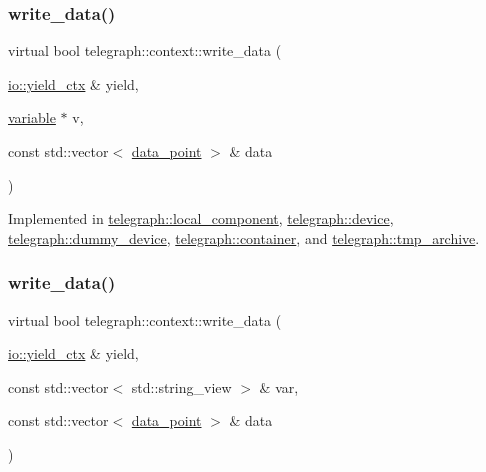 \mbox{\label{classtelegraph_1_1context_a6067b9a6f2590733c81f6a3b2ed9cba7}} 
\subsubsection{\texorpdfstring{write\+\_\+data()}{write\_data()}\hspace{0.1cm}{\footnotesize\ttfamily [1/2]}}
{\footnotesize\ttfamily virtual bool telegraph\+::context\+::write\+\_\+data (\begin{DoxyParamCaption}\item[{\hyperlink{structboost_1_1asio_1_1yield__ctx}{io\+::yield\+\_\+ctx} \&}]{yield,  }\item[{\hyperlink{classtelegraph_1_1variable}{variable} $\ast$}]{v,  }\item[{const std\+::vector$<$ \hyperlink{classtelegraph_1_1data__point}{data\+\_\+point} $>$ \&}]{data }\end{DoxyParamCaption})\hspace{0.3cm}{\ttfamily [pure virtual]}}



Implemented in \hyperlink{classtelegraph_1_1local__component_ac546cfea4802ef3ca125c5dc183adf6c}{telegraph\+::local\+\_\+component}, \hyperlink{classtelegraph_1_1device_a60150e55bc6fb63d27252051caf462db}{telegraph\+::device}, \hyperlink{classtelegraph_1_1dummy__device_a162f8f7a02c2907693ecf86662f6ffe1}{telegraph\+::dummy\+\_\+device}, \hyperlink{classtelegraph_1_1container_aad8390913b2961a2270e6d4065deb59b}{telegraph\+::container}, and \hyperlink{classtelegraph_1_1tmp__archive_ae1838ff3fc3f1cd0eab31535a2f2e974}{telegraph\+::tmp\+\_\+archive}.

\mbox{\label{classtelegraph_1_1context_a1f600d6159df21dd2750b1c706ca3412}} 
\subsubsection{\texorpdfstring{write\+\_\+data()}{write\_data()}\hspace{0.1cm}{\footnotesize\ttfamily [2/2]}}
{\footnotesize\ttfamily virtual bool telegraph\+::context\+::write\+\_\+data (\begin{DoxyParamCaption}\item[{\hyperlink{structboost_1_1asio_1_1yield__ctx}{io\+::yield\+\_\+ctx} \&}]{yield,  }\item[{const std\+::vector$<$ std\+::string\+\_\+view $>$ \&}]{var,  }\item[{const std\+::vector$<$ \hyperlink{classtelegraph_1_1data__point}{data\+\_\+point} $>$ \&}]{data }\end{DoxyParamCaption})\hspace{0.3cm}{\ttfamily [pure virtual]}}



